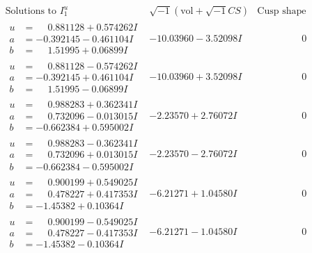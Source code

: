 \documentclass[1p]{elsarticle_modified}
\theoremstyle{definition}
\newcommand{\I}{\sqrt{-1}}
\begin{document}
$$\begin{array}{c|c|c}  
\text{Solutions to }I^u_{1}& \I (\text{vol} + \sqrt{-1}CS) & \text{Cusp shape}\\
 \hline 
\begin{aligned}
u &= \phantom{-}0.881128 + 0.574262 I \\
a &= -0.392145 - 0.461104 I \\
b &= \phantom{-}1.51995 + 0.06899 I\end{aligned}
 & -10.03960 - 3.52098 I & \phantom{-0.000000 } 0 \\ \hline\begin{aligned}
u &= \phantom{-}0.881128 - 0.574262 I \\
a &= -0.392145 + 0.461104 I \\
b &= \phantom{-}1.51995 - 0.06899 I\end{aligned}
 & -10.03960 + 3.52098 I & \phantom{-0.000000 } 0 \\ \hline\begin{aligned}
u &= \phantom{-}0.988283 + 0.362341 I \\
a &= \phantom{-}0.732096 - 0.013015 I \\
b &= -0.662384 + 0.595002 I\end{aligned}
 & -2.23570 + 2.76072 I & \phantom{-0.000000 } 0 \\ \hline\begin{aligned}
u &= \phantom{-}0.988283 - 0.362341 I \\
a &= \phantom{-}0.732096 + 0.013015 I \\
b &= -0.662384 - 0.595002 I\end{aligned}
 & -2.23570 - 2.76072 I & \phantom{-0.000000 } 0 \\ \hline\begin{aligned}
u &= \phantom{-}0.900199 + 0.549025 I \\
a &= \phantom{-}0.478227 + 0.417353 I \\
b &= -1.45382 + 0.10364 I\end{aligned}
 & -6.21271 + 1.04580 I & \phantom{-0.000000 } 0 \\ \hline\begin{aligned}
u &= \phantom{-}0.900199 - 0.549025 I \\
a &= \phantom{-}0.478227 - 0.417353 I \\
b &= -1.45382 - 0.10364 I\end{aligned}
 & -6.21271 - 1.04580 I & \phantom{-0.000000 } 0 \\ \hline\begin{aligned}

\end{aligned}
\end{array}$$
\end{document}
